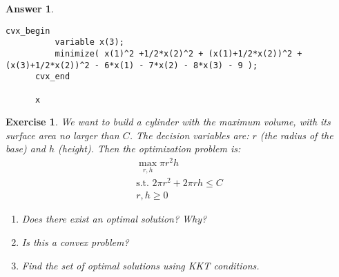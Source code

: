 \documentclass[12pt]{article}
\theoremstyle{colon}
\newtheorem{exercise}{Exercise}
\newtheorem*{answer}{Answer}
\begin{document}
\begin{answer}
\begin{enumerate}[label=\arabic*)]
\begin{lstlisting}[style=Matlab-editor, basicstyle=\scriptsize]
      cvx_begin
          variable x(3);
          minimize( x(1)^2 +1/2*x(2)^2 + (x(1)+1/2*x(2))^2 +(x(3)+1/2*x(2))^2 - 6*x(1) - 7*x(2) - 8*x(3) - 9 );
      cvx_end

      x
    \end{lstlisting}
  \end{enumerate}
\end{answer}

\clearpage

\begin{exercise}
  We want to build a cylinder with the maximum volume, with its surface area no larger than $C$. The decision variables are: $r$ (the radius of the base) and $h$ (height). Then the optimization problem is:
  \begin{gather*}
    \max_{r,h} \pi r^2 h \\
    \text{s.t. } 2 \pi r^2 + 2 \pi r h \leq C \\
    r, h \geq 0
  \end{gather*}
  \begin{enumerate}[label=\arabic*)]
    \item Does there exist an optimal solution? Why?
    \item Is this a convex problem?
    \item Find the set of optimal solutions using KKT conditions.
  \end{enumerate}
\end{exercise}
\end{document}
